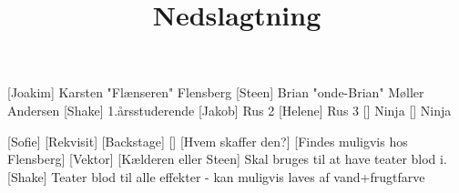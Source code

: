 \documentclass[a4paper,11pt]{article}
\title{Nedslagtning}
\begin{document}
\maketitle

\begin{roles}
[Joakim] Karsten "Flænseren" Flensberg
[Steen] Brian "onde-Brian" Møller Andersen
[Shake] 1.årsstuderende
[Jakob] Rus 2
[Helene] Rus 3
[] Ninja
[] Ninja
\end{roles}


\begin{props}
[Sofie]
[Rekvisit]
[Backstage]
[]
[Hvem skaffer den?]
[Findes muligvis hos Flensberg]
[Vektor]
[Kælderen eller Steen]
Skal bruges til at have teater blod i.
[Shake] Teater blod til alle effekter - kan muligvis laves af vand+frugtfarve
\end{props}
\end{document}
